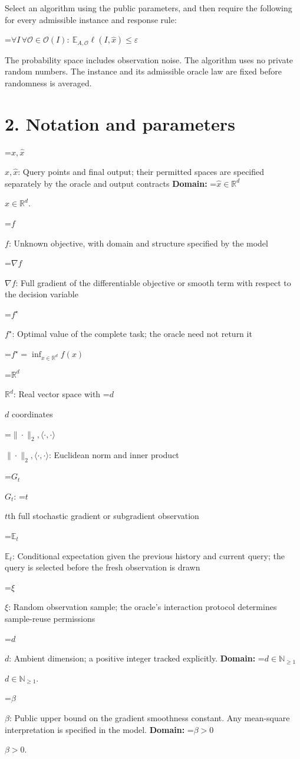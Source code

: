 \documentclass[10pt,a4paper]{article}
\newcommand{\AtlasMath}[1]{\par\begingroup\centering\setbox0=\hbox{$\displaystyle #1$}\ifdim\wd0>1.4\linewidth\typeout{ATLAS WIDE FORMULA: \the\wd0}\fi\ifdim\wd0>\linewidth\resizebox{\linewidth}{!}{\box0}\else\box0\fi\par\endgroup}
\newcommand{\AtlasInlineMath}[1]{\begingroup\setbox0=\hbox{$#1$}\ifdim\wd0>.4\linewidth\endgroup\AtlasMath{#1}\else\endgroup$#1$\fi}
\begin{document}
Select an algorithm using the public parameters, and then require the following for every admissible instance and response rule:


\AtlasMath{\forall I\,\forall\mathcal{O}\in\mathcal{O}(I):\ \mathbb{E}_{A,\mathcal{O}}\ell(I,\widehat{x})\le\varepsilon}


The probability space includes observation noise. The algorithm uses no private random numbers. The instance and its admissible oracle law are fixed before randomness is averaged.

\section{2. Notation and parameters}
\AtlasInlineMath{x,\widehat{x}}: Query points and final output; their permitted spaces are specified separately by the oracle and output contracts \textbf{Domain:} \AtlasInlineMath{\widehat{x}\in \mathbb{R}^d}.

\AtlasInlineMath{f}: Unknown objective, with domain and structure specified by the model

\AtlasInlineMath{\nabla f}: Full gradient of the differentiable objective or smooth term with respect to the decision variable

\AtlasInlineMath{f^\star}: Optimal value of the complete task; the oracle need not return it


\AtlasMath{f^\star=\inf_{x\in \mathbb{R}^d}f(x)}


\AtlasInlineMath{\mathbb{R}^d}: Real vector space with \AtlasInlineMath{d} coordinates

\AtlasInlineMath{\|\cdot\|_2,\langle\cdot,\cdot\rangle}: Euclidean norm and inner product

\AtlasInlineMath{G_t}: \AtlasInlineMath{t}th full stochastic gradient or subgradient observation

\AtlasInlineMath{\mathbb{E}_t}: Conditional expectation given the previous history and current query; the query is selected before the fresh observation is drawn

\AtlasInlineMath{\xi}: Random observation sample; the oracle's interaction protocol determines sample-reuse permissions

\AtlasInlineMath{d}: Ambient dimension; a positive integer tracked explicitly. \textbf{Domain:} \AtlasInlineMath{d\in\mathbb{N}_{\ge1}}.

\AtlasInlineMath{\beta}: Public upper bound on the gradient smoothness constant. Any mean-square interpretation is specified in the model. \textbf{Domain:} \AtlasInlineMath{\beta>0}.
\end{document}
